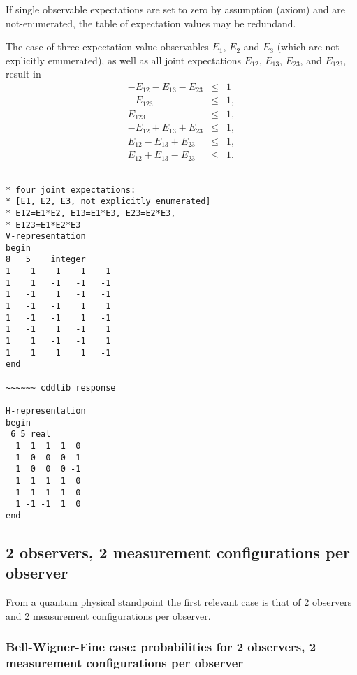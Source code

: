 \documentclass[%
  twocolumn,
 showpacs,
 showkeys,
 preprintnumbers,
 amsmath,amssymb,
 aps,
  pra,
  longbibliography,
 floatfix,
 ]{revtex4-1}
\begin{document}
If single observable  expectations  are set to zero by assumption (axiom) and are not-enumerated,
the table of expectation values may be redundand.

The case of three expectation value observables
$E_1$, $E_2$  and $E_3$ (which are not explicitly enumerated),
as well as all joint expectations $E_{12}$, $E_{13}$, $E_{23}$, and $E_{123}$,
result in
\begin{eqnarray}
- E_{12}- E_{13}- E_{23} &\le& 1
\\
- E_{123} &\le& 1,
\\
E_{123} &\le& 1,
\\
- E_{12}+ E_{13}+ E_{23} &\le& 1,
\\
 E_{12}- E_{13}+ E_{23} &\le& 1,
\\
 E_{12}+ E_{13}- E_{23} &\le& 1
.
\label{2017-b-1-3-e-ia}
\end{eqnarray}

{ \begin{lstlisting}[backgroundcolor=\color{yellow!10},framerule=0pt,breaklines=true, frame=tb]

* four joint expectations:
* [E1, E2, E3, not explicitly enumerated]
* E12=E1*E2, E13=E1*E3, E23=E2*E3,
* E123=E1*E2*E3
V-representation
begin
8   5    integer
1    1    1    1    1
1    1   -1   -1   -1
1   -1    1   -1   -1
1   -1   -1    1    1
1   -1   -1    1   -1
1   -1    1   -1    1
1    1   -1   -1    1
1    1    1    1   -1
end

~~~~~~ cddlib response

H-representation
begin
 6 5 real
  1  1  1  1  0
  1  0  0  0  1
  1  0  0  0 -1
  1  1 -1 -1  0
  1 -1  1 -1  0
  1 -1 -1  1  0
end

\end{lstlisting}  }


\subsection{2 observers, 2 measurement configurations per observer}
\label{2017-b-totmcpoa}
From a quantum physical standpoint the first relevant case is that of 2 observers and 2 measurement configurations per observer.

\subsubsection{Bell-Wigner-Fine case: probabilities for 2 observers, 2 measurement configurations per observer}
\label{2017-b-bwfa}
\end{document}
